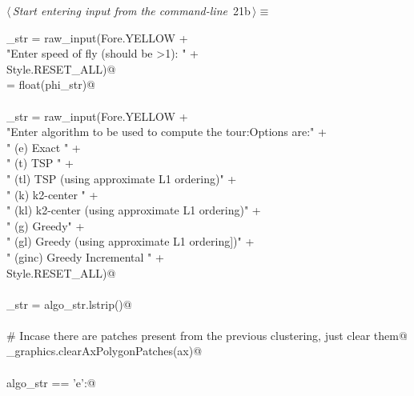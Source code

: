 \documentclass[11.5pt]{report}
\begin{document}
\newchunk 
\begin{flushleft} \small\label{scrap14}\raggedright\small
{} $\langle\,${\itshape Start entering input from the command-line}\nobreak\ {\footnotesize {21b}}$\,\rangle\equiv$
\vspace{-1ex}
\begin{list}{}{} \item
\mbox{}\verb@phi_str = raw_input(Fore.YELLOW + \@\\
\mbox{}\verb@          "Enter speed of fly (should be >1): " +\@\\
\mbox{}\verb@           Style.RESET_ALL)@\\
\mbox{}\verb@phi = float(phi_str)@\\
\mbox{}\verb@@\\
\mbox{}\verb@algo_str = raw_input(Fore.YELLOW + \@\\
\mbox{}\verb@          "Enter algorithm to be used to compute the tour:\n Options are:\n" +\@\\
\mbox{}\verb@        "  (e)   Exact \n"                                   +\@\\
\mbox{}\verb@        "  (t)   TSP   \n"                                   +\@\\
\mbox{}\verb@        "  (tl)  TSP   (using approximate L1 ordering)\n"    +\@\\
\mbox{}\verb@        "  (k)   k2-center   \n"                             +\@\\
\mbox{}\verb@        "  (kl)  k2-center (using approximate L1 ordering)\n"  +\@\\
\mbox{}\verb@        "  (g)   Greedy\n"                                   +\@\\
\mbox{}\verb@        "  (gl)  Greedy (using approximate L1 ordering])\n"  +\@\\
\mbox{}\verb@        "  (ginc) Greedy Incremental  "  +\@\\
\mbox{}\verb@        Style.RESET_ALL)@\\
\mbox{}\verb@@\\
\mbox{}\verb@algo_str = algo_str.lstrip()@\\
\mbox{}\verb@@\\
\mbox{}\verb@# Incase there are patches present from the previous clustering, just clear them@\\
\mbox{}\verb@utils_graphics.clearAxPolygonPatches(ax)@\\
\mbox{}\verb@@\\
\mbox{}\verb@if   algo_str == 'e':@\\

\end{list}
\end{flushleft}
\end{document}
